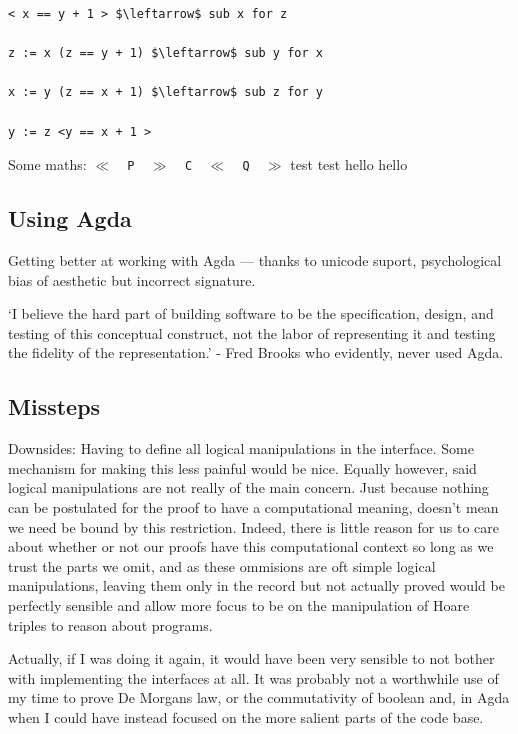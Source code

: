 \documentclass[oneside,12pt]{article}
\begin{document}
\begin{verbatim}
< x == y + 1 > $\leftarrow$ sub x for z
  
z := x (z == y + 1) $\leftarrow$ sub y for x

x := y (z == x + 1) $\leftarrow$ sub z for y

y := z <y == x + 1 >

\end{verbatim}


Some maths: \texttt{$\ll$\!\,\,P\,\,\!$\gg$\!\,\,C\,\,\!$\ll$\!\,\,Q\,\,\!$\gg$} test test hello hello
 


\subsection{Using Agda}

Getting better at working with Agda --- thanks to unicode suport, psychological bias of aesthetic but incorrect signature.

`I believe the hard part of building software to be the specification, design, and testing of this conceptual construct, not the labor of representing it and testing the fidelity of the representation.' - Fred Brooks who evidently, never used Agda.


\subsection{Missteps}


Downsides: Having to define all logical manipulations in the interface. Some mechanism for making this less painful would be nice. Equally however, said logical manipulations are not really of the main concern. Just because nothing can be postulated for the proof to have a computational meaning, doesn't mean we need be bound by this restriction. Indeed, there is little reason for us to care about whether or not our proofs have this computational context so long as we trust the parts we omit, and as these ommisions are oft simple logical manipulations, leaving them only in the record but not actually proved would be perfectly sensible and allow more focus to be on the manipulation of Hoare triples to reason about programs.

Actually, if I was doing it again, it would have been very sensible to not bother with implementing the interfaces at all. It was probably not a worthwhile use of my time to prove De Morgans law, or the commutativity of boolean and, in Agda when I could have instead focused on the more salient parts of the code base.
\end{document}

